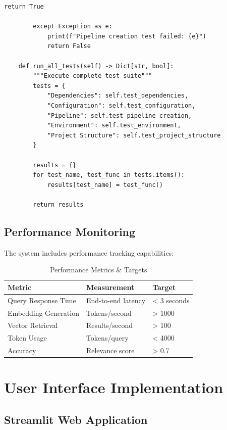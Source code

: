 \documentclass[12pt,a4paper]{article}
\begin{document}
\begin{lstlisting}[caption=Testing Framework Structure]
            return True
            
        except Exception as e:
            print(f"Pipeline creation test failed: {e}")
            return False
    
    def run_all_tests(self) -> Dict[str, bool]:
        """Execute complete test suite"""
        tests = {
            "Dependencies": self.test_dependencies,
            "Configuration": self.test_configuration,
            "Pipeline": self.test_pipeline_creation,
            "Environment": self.test_environment,
            "Project Structure": self.test_project_structure
        }
        
        results = {}
        for test_name, test_func in tests.items():
            results[test_name] = test_func()
        
        return results
\end{lstlisting}

\subsection{Performance Monitoring}

The system includes performance tracking capabilities:

\begin{table}[H]
\centering
\begin{tabular}{@{}lll@{}}
\toprule
\textbf{Metric} & \textbf{Measurement} & \textbf{Target} \\
\midrule
Query Response Time & End-to-end latency & < 3 seconds \\
Embedding Generation & Tokens/second & > 1000 \\
Vector Retrieval & Results/second & > 100 \\
Token Usage & Tokens/query & < 4000 \\
Accuracy & Relevance score & > 0.7 \\
\bottomrule
\end{tabular}
\caption{Performance Metrics \& Targets}
\end{table}

\section{User Interface Implementation}

\subsection{Streamlit Web Application}
\end{document}
